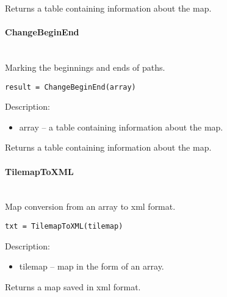 Returns a table containing information about the map.

\paragraph{ChangeBeginEnd} \hspace{0pt} \\
Marking the beginnings and ends of paths.
\begin{lstlisting}[style=Matlab-editor]
result = ChangeBeginEnd(array)
\end{lstlisting}

Description:
\begin{itemize}
\item  array -- a table containing information about the map.
\end{itemize}

Returns a table containing information about the map.

\paragraph{TilemapToXML} \hspace{0pt} \\
Map conversion from an array to xml format.
\begin{lstlisting}[style=Matlab-editor]
txt = TilemapToXML(tilemap)
\end{lstlisting}

Description:
\begin{itemize}
\item  tilemap -- map in the form of an array.
\end{itemize}

Returns a map saved in xml format.

